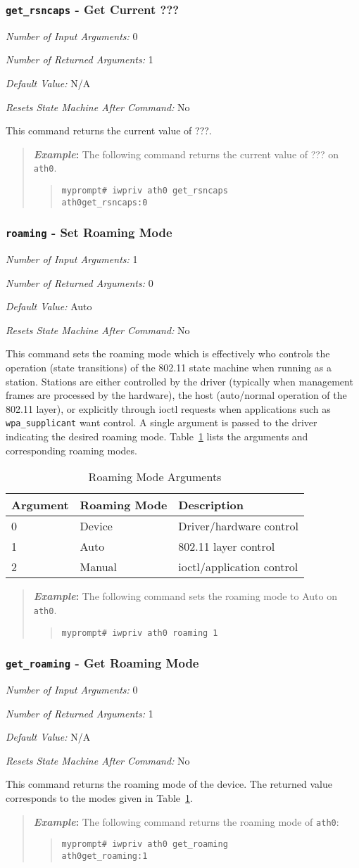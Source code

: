 \documentclass[10pt,fullpage]{article}
\newcommand{\mytt}[1]{{\texttt{#1}}}
\newcommand{\bv}{\begin{verse}}
\newcommand{\ev}{\end{verse}}
\newcommand{\cmd}[1]{{\texttt{myprompt\# #1}}}
\newcommand{\argdesc}[4]{\begin{description}
\itemsep -6pt
\item \textit{Number of Input Arguments:} #1
\item \textit{Number of Returned Arguments:} #2
\item \textit{Default Value:} #3
\item \textit{Resets State Machine After Command:} #4
\end{description}
}
\newenvironment{example}{\begin{quote}\textbf{\textit{Example}:}}{\end{quote}}
\begin{document}
\subsubsection{\mytt{get\_rsncaps} - Get Current ???}
\argdesc{0}{1}{N/A}{No}
This command returns the current value of ???.
\begin{example}
  The following command returns the current value of ??? on
  \mytt{ath0}.
  \bv
  \cmd{iwpriv ath0 get\_rsncaps}\\
  \mytt{ath0\hspace{32pt}get\_rsncaps:0}
  \ev
\end{example}

\subsubsection{\mytt{roaming} - Set Roaming Mode}
\argdesc{1}{0}{Auto}{No}
This command sets the roaming mode which is effectively who controls
the operation (state transitions) of the 802.11 state machine when
running as a station.  Stations are either controlled by the driver
(typically when management frames are processed by the hardware), the
host (auto/normal operation of the 802.11 layer), or explicitly
through ioctl requests when applications such as
\mytt{wpa\_supplicant} want control. A single argument is passed to
the driver indicating the desired roaming mode.
Table~\ref{tab:roaming} lists the arguments and corresponding roaming
modes.
\begin{table}[h*]
  \centering
  \begin{tabular}{|l|l|l|} \hline
    Argument & Roaming Mode & Description \\ \hline
    0 & Device & Driver/hardware control \\
    1 & Auto & 802.11 layer control \\
    2 & Manual & ioctl/application control \\ \hline
  \end{tabular}
  \caption{Roaming Mode Arguments}
  \label{tab:roaming}
\end{table}
\begin{example}
  The following command sets the roaming mode to Auto on \mytt{ath0}.
  \bv
  \cmd{iwpriv ath0 roaming 1}
  \ev
\end{example}

\subsubsection{\mytt{get\_roaming} - Get Roaming Mode}
\argdesc{0}{1}{N/A}{No}
This command returns the roaming mode of the device.  The returned
value corresponds to the modes given in Table~\ref{tab:roaming}.
\begin{example}
  The following command returns the roaming mode of \mytt{ath0}:
  \bv
  \cmd{iwpriv ath0 get\_roaming}\\
  \mytt{ath0\hspace{32pt}get\_roaming:1}
  \ev
\end{example}
\end{document}
